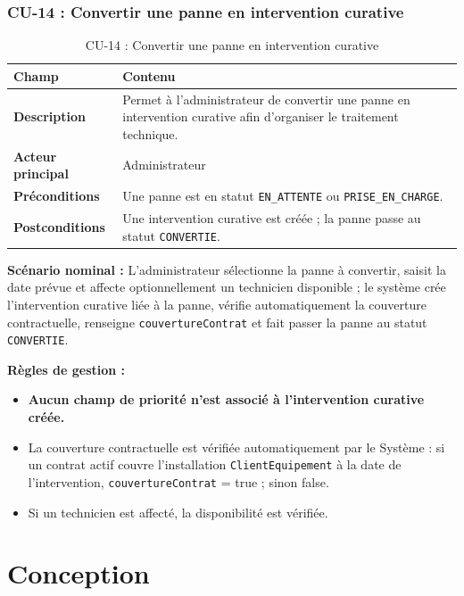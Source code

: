\subsubsection{CU-14 : Convertir une panne en intervention curative}

\begin{table}[H]
\centering
\caption{CU-14 : Convertir une panne en intervention curative}
\label{tab:ch4:cu14}
\begin{tabular}{|p{3.5cm}|p{11cm}|}
\hline
\textbf{Champ} & \textbf{Contenu} \\
\hline
\textbf{Description}
  & Permet à l'administrateur de convertir une panne en intervention curative afin
    d'organiser le traitement technique. \\
\hline
\textbf{Acteur principal}
  & Administrateur \\
\hline
\textbf{Préconditions}
  & Une panne est en statut \texttt{EN\_ATTENTE} ou \texttt{PRISE\_EN\_CHARGE}. \\
\hline
\textbf{Postconditions}
  & Une intervention curative est créée ; la panne passe au statut \texttt{CONVERTIE}. \\
\hline
\end{tabular}
\end{table}

\textbf{Scénario nominal :} L'administrateur sélectionne la panne à convertir, saisit la date prévue et affecte optionnellement un technicien disponible ; le système crée l'intervention curative liée à la panne, vérifie automatiquement la couverture contractuelle, renseigne \texttt{couvertureContrat} et fait passer la panne au statut \texttt{CONVERTIE}.

\textbf{Règles de gestion :}
\begin{itemize}
    \item \textbf{Aucun champ de priorité n'est associé à l'intervention curative créée.}
    \item La couverture contractuelle est vérifiée automatiquement par le Système : si un contrat actif couvre l'installation \texttt{ClientEquipement} à la date de l'intervention, \texttt{couvertureContrat} = true ; sinon false.
    \item Si un technicien est affecté, la disponibilité est vérifiée.
\end{itemize}

\section{Conception}

